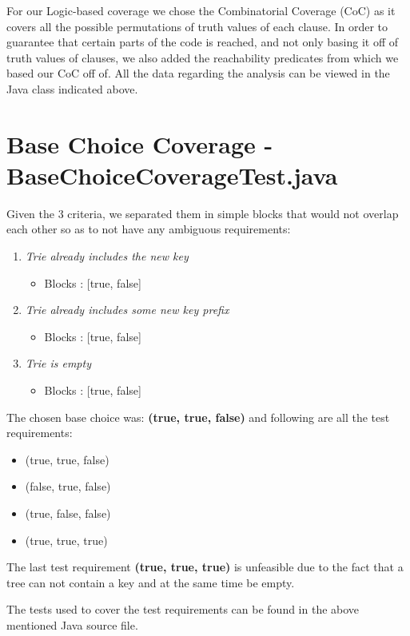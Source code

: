 \documentclass[12pt]{article}
\begin{document}
For our Logic-based coverage we chose the Combinatorial Coverage (CoC) as it covers all the possible permutations of truth values of each clause. In order to guarantee that certain parts of the code is reached, and not only basing it off of truth values of clauses, we also added the reachability predicates from which we based our CoC off of. All the data regarding the analysis can be viewed in the Java class indicated above.

\section{Base Choice Coverage - \\BaseChoiceCoverageTest.java}
Given the 3 criteria, we separated them in simple blocks that would not overlap each other so as to not have any ambiguous requirements:
\begin{enumerate}
	\item \textit{Trie already includes the new key}
		\begin{itemize}
			\item Blocks : [true, false]
		\end{itemize}
	\item \textit{Trie already includes some new key prefix}
		\begin{itemize}
			\item Blocks : [true, false]
		\end{itemize}
	\item \textit{Trie is empty}
		\begin{itemize}
			\item Blocks : [true, false]
		\end{itemize}
\end{enumerate}

The chosen base choice was: \textbf{(true, true, false)} and following are all the test requirements: 
	\begin{itemize}
	 	\item (true, true, false)
	 	\item (false, true, false)
	 	\item (true, false, false)
	 	\item (true, true, true)
	\end{itemize}
	
The last test requirement \textbf{(true, true, true)} is unfeasible due to the fact that a tree can not contain a key and at the same time be empty.

The tests used to cover the test requirements can be found in the above mentioned Java source file.
\end{document}
